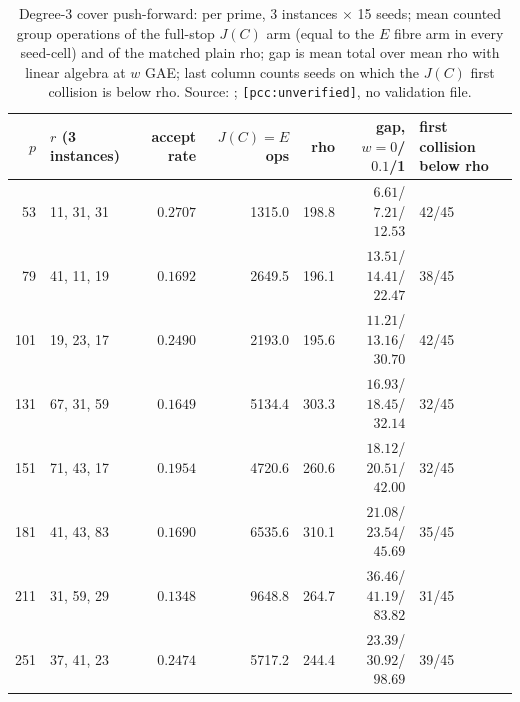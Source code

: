 \begin{table}[t]
\centering\footnotesize
\begin{tabular}{@{}rlrrrrl@{}}
\toprule
$p$ & $r$ (3 instances) & accept rate & $J(C)=E$ ops & rho & gap, $w=0$/$0.1$/1 & first collision below rho \\
\midrule
53 & 11, 31, 31 & $0.2707$ & 1315.0 & 198.8 & $6.61$/$7.21$/$12.53$ & 42/45 \\
79 & 41, 11, 19 & $0.1692$ & 2649.5 & 196.1 & $13.51$/$14.41$/$22.47$ & 38/45 \\
101 & 19, 23, 17 & $0.2490$ & 2193.0 & 195.6 & $11.21$/$13.16$/$30.70$ & 42/45 \\
131 & 67, 31, 59 & $0.1649$ & 5134.4 & 303.3 & $16.93$/$18.45$/$32.14$ & 32/45 \\
151 & 71, 43, 17 & $0.1954$ & 4720.6 & 260.6 & $18.12$/$20.51$/$42.00$ & 32/45 \\
181 & 41, 43, 83 & $0.1690$ & 6535.6 & 310.1 & $21.08$/$23.54$/$45.69$ & 35/45 \\
211 & 31, 59, 29 & $0.1348$ & 9648.8 & 264.7 & $36.46$/$41.19$/$83.82$ & 31/45 \\
251 & 37, 41, 23 & $0.2474$ & 5717.2 & 244.4 & $23.39$/$30.92$/$98.69$ & 39/45 \\
\bottomrule
\end{tabular}
\caption[]{Degree-3 cover push-forward: per prime, 3 instances $\times$ 15
seeds; mean counted group operations of the full-stop $J(C)$ arm (equal to
the $E$ fibre arm in every seed-cell) and of the matched plain rho; gap is
mean total over mean rho with linear algebra at $w$ GAE; last column counts
seeds on which the $J(C)$ first collision is below rho. Source:
;
\texttt{[pcc:unverified]}, no validation file.}
\label{tab:obs-deg3}
\end{table}

